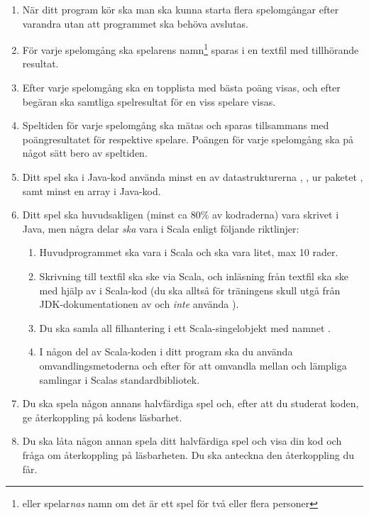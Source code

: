 \begin{enumerate}
  \item När ditt program kör ska man ska kunna starta flera spelomgångar efter varandra utan att programmet ska behöva avslutas.
  \item För varje spelomgång ska spelarens namn\footnote{eller spelar\emph{nas} namn om det är ett spel för två eller flera personer} sparas i en textfil med tillhörande resultat.
  \item Efter varje spelomgång ska en topplista med bästa poäng visas, och efter begäran ska samtliga spelresultat för en viss spelare visas.
  \item Speltiden för varje spelomgång ska mätas och sparas tillsammans med poängresultatet för respektive spelare. Poängen för varje spelomgång ska på något sätt bero av speltiden.
  \item Ditt spel ska i Java-kod använda minst en av datastrukturerna
  ,
  ,
   ur paketet , samt minst en array i Java-kod.
  \item Ditt spel ska huvudsakligen (minst ca 80\% av kodraderna) vara skrivet i Java, men några delar \emph{ska} vara i Scala enligt följande riktlinjer:
  \begin{enumerate}
    \item Huvudprogrammet ska vara i Scala och  ska vara litet, max 10 rader.
    \item Skrivning till textfil ska ske via Scala, och inläsning från textfil ska ske med hjälp av  i Scala-kod (du ska alltså för träningens skull utgå från JDK-dokumentationen av  och \emph{inte} använda ).
    \item Du ska samla all filhantering i ett Scala-singelobjekt med namnet .
    \item I någon del av Scala-koden i ditt program ska du
använda omvandlingsmetoderna  och  efter  för att omvandla mellan  och lämpliga samlingar i Scalas standardbibliotek.
  \end{enumerate}
  \item Du ska spela någon annans halvfärdiga spel och, efter att du studerat koden, ge återkoppling på kodens läsbarhet.
  \item Du ska låta någon annan spela ditt halvfärdiga spel och visa din kod och fråga om återkoppling på läsbarheten. Du ska anteckna den återkoppling du får.

\end{enumerate}

